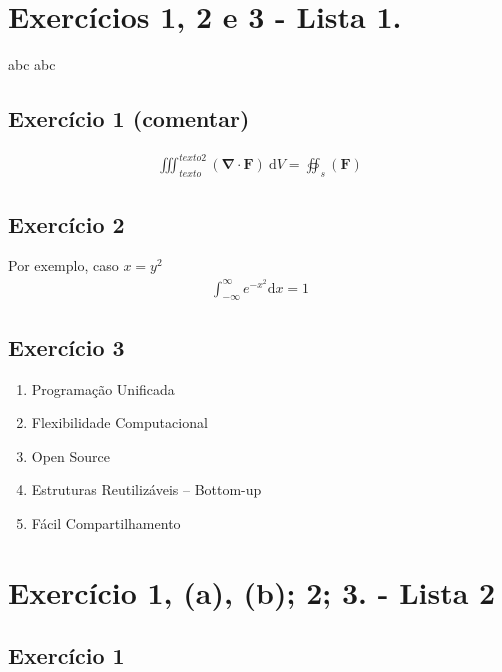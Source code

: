 \documentclass[11pt]{article}
\date{\today}
\title{}
\begin{document}
\tableofcontents


\section{Exercícios 1, 2 e 3 - Lista 1.}
\label{sec:org2c07079}
abc \textrm{abc}
\subsection{Exercício 1 (comentar)}
\label{sec:orgc669f6f}
\begin{equation}
\begin{aligned}
\iiint_{texto}^{texto2}{(\mathbf{\nabla \cdot F}) \: \text{d} V} = \oiint_s{(\mathbf{F})}
\end{aligned}
\end{equation}
\subsection{Exercício 2}
\label{sec:org832ed72}
Por exemplo, caso \(x=y^2\)
\begin{equation}
\begin{aligned}
\int_{-\infty}^{\infty}{e^{-x^2} \mathrm{d}x} = 1
\end{aligned}
\end{equation}
\subsection{Exercício 3}
\label{sec:org791f523}

\begin{enumerate}
  \item<1->[👐]{Programação Unificada}
  \item<5->[\ding{83}]{Flexibilidade Computacional}
  \item<2->[\ding{88}]{Open Source}
  \item<3->[\ding{93}]{Estruturas Reutilizáveis -- Bottom-up}
  \item<4->[\ding{100}]{Fácil Compartilhamento}
\end{enumerate}

\section{Exercício 1, (a), (b); 2; 3. - Lista 2}
\label{sec:org7ff32a4}
\subsection{Exercício 1}
\label{sec:orgc1c7bf0}
\end{document}
